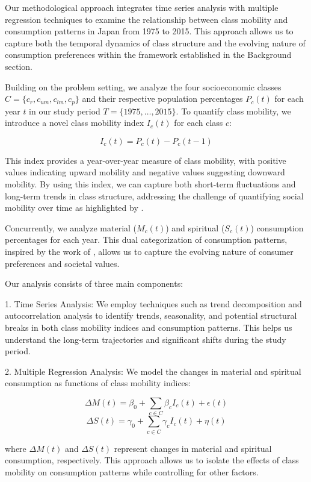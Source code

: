 \documentclass{article} %
\begin{document}
Our methodological approach integrates time series analysis with multiple regression techniques to examine the relationship between class mobility and consumption patterns in Japan from 1975 to 2015. This approach allows us to capture both the temporal dynamics of class structure and the evolving nature of consumption preferences within the framework established in the Background section.

Building on the problem setting, we analyze the four socioeconomic classes $C = \{c_r, c_{um}, c_{lm}, c_p\}$ and their respective population percentages $P_c(t)$ for each year $t$ in our study period $T = \{1975, \ldots, 2015\}$. To quantify class mobility, we introduce a novel class mobility index $I_c(t)$ for each class $c$:

\[I_c(t) = P_c(t) - P_c(t-1)\]

This index provides a year-over-year measure of class mobility, with positive values indicating upward mobility and negative values suggesting downward mobility. By using this index, we can capture both short-term fluctuations and long-term trends in class structure, addressing the challenge of quantifying social mobility over time as highlighted by \citet{Brockington2019AssetsAD}.

Concurrently, we analyze material ($M_c(t)$) and spiritual ($S_c(t)$) consumption percentages for each year. This dual categorization of consumption patterns, inspired by the work of \citet{Huaiju2014EthicalIO}, allows us to capture the evolving nature of consumer preferences and societal values.

Our analysis consists of three main components:

1. Time Series Analysis: We employ techniques such as trend decomposition and autocorrelation analysis to identify trends, seasonality, and potential structural breaks in both class mobility indices and consumption patterns. This helps us understand the long-term trajectories and significant shifts during the study period.

2. Multiple Regression Analysis: We model the changes in material and spiritual consumption as functions of class mobility indices:

   \[\Delta M(t) = \beta_0 + \sum_{c \in C} \beta_c I_c(t) + \epsilon(t)\]
   \[\Delta S(t) = \gamma_0 + \sum_{c \in C} \gamma_c I_c(t) + \eta(t)\]

   where $\Delta M(t)$ and $\Delta S(t)$ represent changes in material and spiritual consumption, respectively. This approach allows us to isolate the effects of class mobility on consumption patterns while controlling for other factors.
\end{document}
